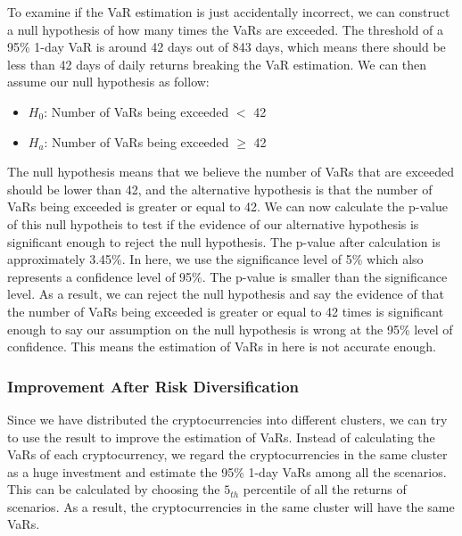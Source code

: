 \documentclass[11pt]{article} %
\theoremstyle{plain}
\theoremstyle{definition}
\begin{document}
To examine if the VaR estimation is just accidentally incorrect, we can construct a null hypothesis of how many times the VaRs are exceeded. The threshold of a 95\% 1-day VaR is around 42 days out of 843 days, which means there should be less than 42 days of daily returns breaking the VaR estimation. We can then assume our null hypothesis as follow:

\begin{itemize}
    \item \textsl{$H_0$}: Number of VaRs being exceeded $<$ 42
    \item \textsl{$H_a$}: Number of VaRs being exceeded $\geq$ 42
\end{itemize}

The null hypothesis means that we believe the number of VaRs that are exceeded should be lower than 42, and the alternative hypothesis is that the number of VaRs being exceeded is greater or equal to 42. We can now calculate the p-value of this null hypotheis to test if the evidence of our alternative hypothesis is significant enough to reject the null hypothesis. The p-value after calculation is approximately 3.45\%. In here, we use the significance level of 5\% which also represents a confidence level of 95\%. The p-value is smaller than the significance level. As a result, we can reject the null hypothesis and say the evidence of that the number of VaRs being exceeded is greater or equal to 42 times is significant enough to say our assumption on the null hypothesis is wrong at the 95\% level of confidence. This means the estimation of VaRs in here is not accurate enough.

\subsubsection{Improvement After Risk Diversification}

Since we have distributed the cryptocurrencies into different clusters, we can try to use the result to improve the estimation of VaRs. Instead of calculating the VaRs of each cryptocurrency, we regard the cryptocurrencies in the same cluster as a huge investment and estimate the 95\% 1-day VaRs among all the scenarios. This can be calculated by choosing the $5_{th}$ percentile of all the returns of scenarios. As a result, the cryptocurrencies in the same cluster will have the same VaRs.
\end{document}

